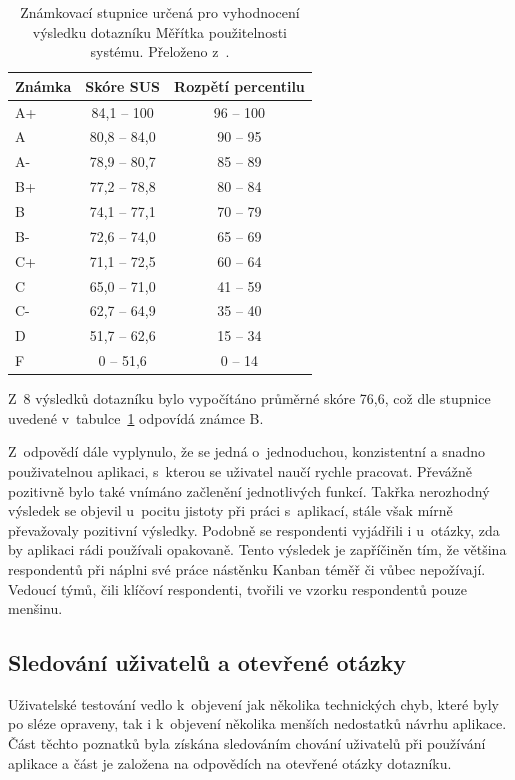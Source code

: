 \begin{table}[H]
\centering
\label{tab:sus}
\caption{Známkovací stupnice určená pro vyhodnocení výsledku dotazníku Měřítka použitelnosti systému. Přeloženo z~\cite{bib:sus-statistics}.}
\begin{tabular}{|l|c|c|}
\hline
Známka & Skóre SUS  & Rozpětí percentilu  \\
\hline
A+    & 84,1 – 100  & 96 – 100          \\
A~    & 80,8 – 84,0 & 90 – 95           \\
A-    & 78,9 – 80,7 & 85 – 89           \\
B+    & 77,2 – 78,8 & 80 – 84           \\
B     & 74,1 – 77,1 & 70 – 79           \\
B-    & 72,6 – 74,0 & 65 – 69           \\
C+    & 71,1 – 72,5 & 60 – 64           \\
C     & 65,0 – 71,0 & 41 – 59           \\
C-    & 62,7 – 64,9 & 35 – 40           \\
D     & 51,7 – 62,6 & 15 – 34           \\
F     &    0 – 51,6 &  0 – 14            \\
\hline
\end{tabular}
\end{table}

Z~8 výsledků dotazníku bylo vypočítáno průměrné skóre 76,6, což dle stupnice uvedené v~tabulce~\ref{tab:sus} odpovídá známce B.

Z~odpovědí dále vyplynulo, že se jedná o~jednoduchou, konzistentní a snadno použivatelnou aplikaci, s~kterou se uživatel naučí rychle pracovat. Převážně pozitivně bylo také vnímáno začlenění jednotlivých funkcí. Takřka nerozhodný výsledek se objevil u~pocitu jistoty při práci s~aplikací, stále však mírně převažovaly pozitivní výsledky. Podobně se respondenti vyjádřili i u~otázky, zda by aplikaci rádi používali opakovaně. Tento výsledek je zapříčiněn tím, že většina respondentů při náplni své práce nástěnku Kanban téměř či vůbec nepožívají. Vedoucí týmů, čili klíčoví respondenti, tvořili ve vzorku respondentů pouze menšinu.


\subsection{Sledování uživatelů a otevřené otázky}
Uživatelské testování vedlo k~objevení jak několika technických chyb, které byly po sléze opraveny, tak i k~objevení několika menších nedostatků návrhu aplikace. Část těchto poznatků byla získána sledováním chování uživatelů při používání aplikace a část je založena na odpovědích na otevřené otázky dotazníku. 

